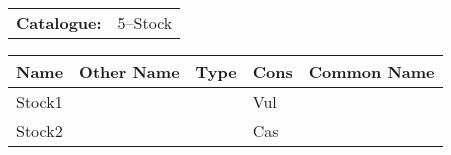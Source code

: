 \begin{tabular}{ p{0.9in} p{1.3in}}
{\bf Catalogue:} & 5--Stock \\ 
\end{tabular}
\begin{longtable}{ p{0.7in}  p{1.0in}  p{0.6in}  p{0.9in}  p{5.1in} }
\hline 
{\bf Name} & {\bf Other Name} & {\bf Type} & {\bf Cons} & {\bf Common Name} \\ 
\hline 
Stock1 &  &  & Vul &  \\ 
Stock2 &  &  & Cas &  \\ 
\hline 
\end{longtable} 
